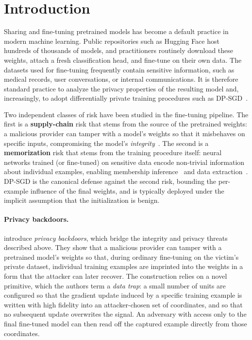 \section{Introduction}

Sharing and fine-tuning pretrained models has become a default practice in modern machine learning. Public repositories such as Hugging Face host hundreds of thousands of models, and practitioners routinely download these weights, attach a fresh classification head, and fine-tune on their own data. The datasets used for fine-tuning frequently contain sensitive information, such as medical records, user conversations, or internal communications. It is therefore standard practice to analyze the privacy properties of the resulting model and, increasingly, to adopt differentially private training procedures such as DP-SGD~\citep{abadi2016deep}. 

Two independent classes of risk have been studied in the fine-tuning pipeline. The first is a \textbf{supply-chain} risk that stems from the source of the pretrained weights: a malicious provider can tamper with a model's weights so that it misbehaves on specific inputs, compromising the model's \emph{integrity}~\citep{gu2017badnets, liu2018trojaning, hong2022handcrafted}. The second is a \textbf{memorization} risk that stems from the training procedure itself: neural networks trained (or fine-tuned) on sensitive data encode non-trivial information about individual examples, enabling membership inference~\citep{shokri2017membership} and data extraction~\citep{carlini2021extracting}. DP-SGD is the canonical defense against the second risk, bounding the per-example influence of the final weights, and is typically deployed under the implicit assumption that the initialization is benign. \\

\paragraph{Privacy backdoors.} \citet{feng2024privacy} introduce \emph{privacy backdoors}, which bridge the integrity and privacy threats described above. They show that a malicious provider can tamper with a pretrained model's weights so that, during ordinary fine-tuning on the victim's private dataset, individual training examples are imprinted into the weights in a form that the attacker can later recover. The construction relies on a novel primitive, which the authors term a \emph{data trap}: a small number of units are configured so that the gradient update induced by a specific training example is written with high fidelity into an attacker-chosen set of coordinates, and so that no subsequent update overwrites the signal. An adversary with access only to the final fine-tuned model can then read off the captured example directly from those coordinates.


